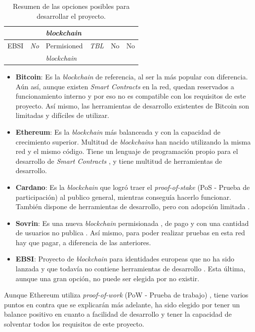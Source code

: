 \begin{table}[h!]
\begin{tabular}{|l|l|l|l|l|l|}
                 &                          &\textit{blockchain}\cite{web:perm}     &                                       &               &                            \\ \hline
        EBSI     & \textit{No}              & Permisioned                           & \textit{TBL}                          & No            & No                         \\ 
                 &                          &\textit{blockchain}\cite{web:perm}     &                                       &               &                            \\ \hline
        \end{tabular}
        \caption{Resumen de las opciones posibles para desarrollar el proyecto.}
\end{table}
\begin{itemize}
    \item \textbf{Bitcoin}: Es la \textit{blockchain} de referencia, al ser la más popular con diferencia. Aún así, aunque existen \textit{Smart Contracts} en la red, quedan reservados a funcionamiento interno y por eso no es compatible con los requisitos de este proyecto. Así mismo, las herramientas de desarrollo existentes de Bitcoin son limitadas y difíciles de utilizar.
    \item \textbf{Ethereum}: Es la \textit{blockchain} más balanceada y con la capacidad de crecimiento superior. Multitud de \textit{blockchains} han nacido utilizando la misma red y el mismo código. Tiene un lenguaje de programación propio para el desarrollo de \textit{Smart Contracts} \cite{web:solidity}, y tiene multitud \cite{web:ganache} \cite{web:hardhat} de herramientas de desarrollo.
    \item \textbf{Cardano}: Es la \textit{blockchain} que logró traer el \textit{proof-of-stake} (PoS - Prueba de participación) \cite{web:pos} al publico general, mientras conseguía hacerlo funcionar. También dispone de herramientas de desarrollo, pero con adopción limitada \cite{web:cardano_dev}.
    \item \textbf{Sovrin}: Es una nueva \textit{blockchain} permisionada \cite{web:perm}, de pago y con una cantidad de usuarios no publica \cite{web:sovrin}. Así mismo, para poder realizar pruebas en esta red hay que pagar, a diferencia de las anteriores.
    \item \textbf{EBSI}: Proyecto de \textit{blockchain} para identidades europeas que no ha sido lanzada y que todavía no contiene herramientas de desarrollo \cite{web:EBSI}. Esta última, aunque una gran opción, no puede ser elegida por no existir.
\end{itemize}
Aunque Ethereum utiliza \textit{proof-of-work} (PoW - Prueba de trabajo) \cite{web:pow} , tiene varios puntos en contra que se explicarán más adelante, ha sido elegido por tener un balance positivo en cuanto a facilidad de desarrollo y tener la capacidad de solventar todos los requisitos de este proyecto.

